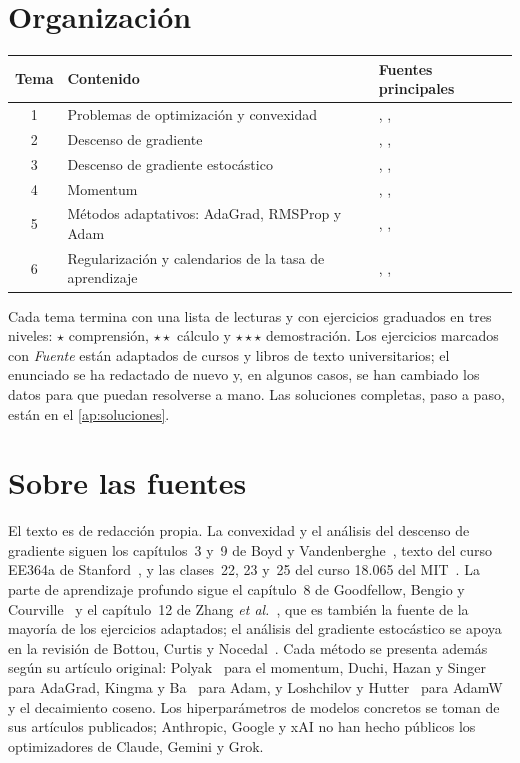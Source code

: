 \documentclass[11pt,a4paper,twoside,openany]{book}
\begin{document}
\section*{Organización}
\begin{center}
\begin{tabular}{@{}cll@{}}
\toprule
Tema & Contenido & Fuentes principales \\
\midrule
1 & Problemas de optimización y convexidad & \cite{bv}, \cite{gbc}, \cite{d2l} \\
2 & Descenso de gradiente & \cite{bv}, \cite{d2l}, \cite{mit18065} \\
3 & Descenso de gradiente estocástico & \cite{d2l}, \cite{gbc}, \cite{bottou} \\
4 & Momentum & \cite{polyak}, \cite{d2l}, \cite{goh} \\
5 & Métodos adaptativos: AdaGrad, RMSProp y Adam & \cite{adam}, \cite{d2l}, \cite{gbc} \\
6 & Regularización y calendarios de la tasa de aprendizaje & \cite{adamw}, \cite{sgdr}, \cite{d2l} \\
\bottomrule
\end{tabular}
\end{center}

Cada tema termina con una lista de lecturas y con ejercicios graduados en tres niveles: $\star$ comprensión, $\star\star$ cálculo y $\star\star\star$ demostración. Los ejercicios marcados con \emph{Fuente} están adaptados de cursos y libros de texto universitarios; el enunciado se ha redactado de nuevo y, en algunos casos, se han cambiado los datos para que puedan resolverse a mano. Las soluciones completas, paso a paso, están en el \cref{ap:soluciones}.

\section*{Sobre las fuentes}
El texto es de redacción propia. La convexidad y el análisis del descenso de gradiente siguen los capítulos~3 y~9 de Boyd y Vandenberghe~\cite{bv}, texto del curso EE364a de Stanford~\cite{ee364a}, y las clases~22, 23 y~25 del curso 18.065 del MIT~\cite{mit18065}. La parte de aprendizaje profundo sigue el capítulo~8 de Goodfellow, Bengio y Courville~\cite{gbc} y el capítulo~12 de Zhang \emph{et al.}~\cite{d2l}, que es también la fuente de la mayoría de los ejercicios adaptados; el análisis del gradiente estocástico se apoya en la revisión de Bottou, Curtis y Nocedal~\cite{bottou}. Cada método se presenta además según su artículo original: Polyak~\cite{polyak} para el momentum, Duchi, Hazan y Singer~\cite{adagrad} para AdaGrad, Kingma y Ba~\cite{adam} para Adam, y Loshchilov y Hutter~\cite{adamw,sgdr} para AdamW y el decaimiento coseno. Los hiperparámetros de modelos concretos se toman de sus artículos publicados; Anthropic, Google y xAI no han hecho públicos los optimizadores de Claude, Gemini y Grok.
\end{document}
